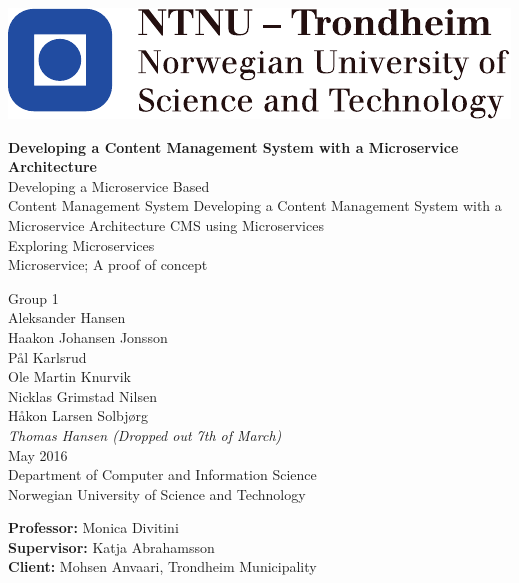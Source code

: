 
\thispagestyle{empty}
\includegraphics[scale=0.7]{fig/NTNU}
\mbox{}\\[6pc]

\begin{center}

\textbf{\Huge{
Developing a Content Management System with a Microservice Architecture
}}\\[5pc]

\if 
Developing a Microservice Based \\ Content Management System
Developing a Content Management System with a Microservice Architecture
CMS using Microservices \\
Exploring Microservices\\
Microservice; A proof of concept
\fi


\large{Group 1}\\
\small{
Aleksander Hansen\\
Haakon Johansen Jonsson\\
Pål Karlsrud\\
Ole Martin Knurvik\\
Nicklas Grimstad Nilsen\\
Håkon Larsen Solbjørg\\
\textit{Thomas Hansen (Dropped out 7th of March)}\\
}
\vspace{35mm} %
\large{May 2016}\\[2pc]
\small{Department of Computer and Information Science}\\
\footnotesize{Norwegian University of Science and Technology}
\end{center}
\vfill

\noindent \textbf{Professor:} Monica Divitini \\
\noindent \textbf{Supervisor:} Katja Abrahamsson \\
\noindent \textbf{Client:} Mohsen Anvaari, Trondheim Municipality
